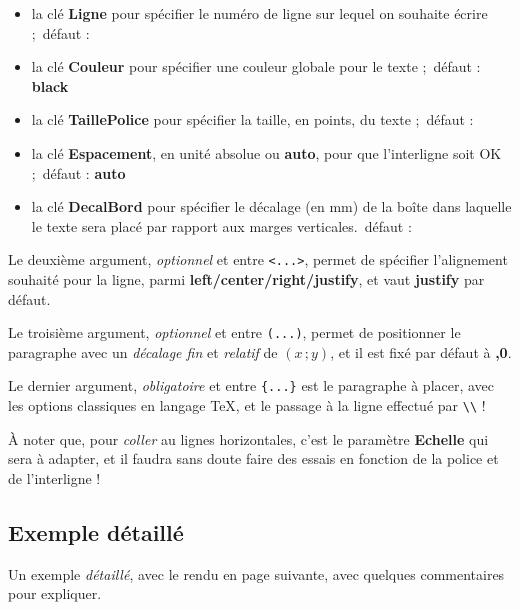 \documentclass[a4paper]{article}
\newcommand\Cle[1]{{\bfseries\sffamily\textlangle #1\textrangle}}
\begin{document}
\begin{itemize}
	\item la clé \Cle{Ligne} pour spécifier le numéro de ligne sur lequel on souhaite écrire ;\hfill~défaut : \Cle{1}
	\item la clé \Cle{Couleur} pour spécifier une couleur globale pour le texte ;\hfill~défaut : \Cle{black}
	\item la clé \Cle{TaillePolice} pour spécifier la taille, en points, du texte ;\hfill~défaut : \Cle{1}
	\item la clé \Cle{Espacement}, en unité absolue ou \Cle{auto}, pour que l'interligne soit OK ;\hfill~défaut : \Cle{auto}
	\item la clé \Cle{DecalBord} pour spécifier le décalage (en mm) de la boîte dans laquelle le texte sera placé par rapport aux marges verticales.\hfill~défaut : \Cle{0}
\end{itemize}

Le deuxième argument, \textit{optionnel} et entre \texttt{<...>}, permet de spécifier l'alignement souhaité pour la ligne, parmi \Cle{left/center/right/justify}, et vaut \Cle{justify} par défaut.

\smallskip

Le troisième argument, \textit{optionnel} et entre \texttt{(...)}, permet de positionner le paragraphe avec un \textit{décalage fin} et \textit{relatif} de $(x\,;y)$, et il est fixé par défaut à \Cle{0,0}.

\smallskip

Le dernier argument, \textit{obligatoire} et entre \texttt{\{...\}} est le paragraphe à placer, avec les options classiques en langage \TeX{}, et le passage à la ligne effectué par \texttt{\textbackslash\textbackslash} !

\medskip

\faBomb{} À noter que, pour \textit{coller} au lignes horizontales, c'est le paramètre \Cle{Echelle} qui sera à adapter, et il faudra sans doute faire des essais en fonction de la police et de l'interligne !

\subsection{Exemple \og détaillé \fg}

Un exemple \textit{détaillé}, avec le rendu en page suivante, avec quelques commentaires pour expliquer.
\end{document}
